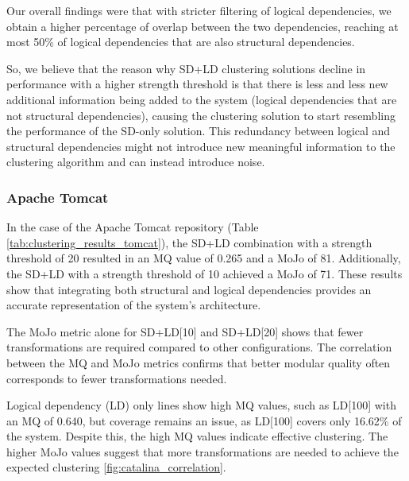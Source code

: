 \documentclass{ieeeaccess}
\begin{document}
Our overall findings were that with stricter filtering of logical dependencies, we obtain a higher percentage of overlap between the two dependencies, reaching at most 50\% of logical dependencies that are also structural dependencies.

So, we believe that the reason why SD+LD clustering solutions decline in performance with a higher strength threshold is that there is less and less new additional information being added to the system (logical dependencies that are not structural dependencies), causing the clustering solution to start resembling the performance of the SD-only solution. This redundancy between logical and structural dependencies might not introduce new meaningful information to the clustering algorithm and can instead introduce noise.


\subsubsection{Apache Tomcat}

In the case of the Apache Tomcat repository (Table \ref{tab:clustering_results_tomcat}), the SD+LD combination with a strength threshold of 20 resulted in an MQ value of 0.265 and a MoJo of 81. Additionally, the SD+LD with a strength threshold of 10 achieved a MoJo of 71. These results show that integrating both structural and logical dependencies provides an accurate representation of the system's architecture.

The MoJo metric alone for SD+LD[10] and SD+LD[20] shows that fewer transformations are required compared to other configurations. The correlation between the MQ and MoJo metrics confirms that better modular quality often corresponds to fewer transformations needed.

Logical dependency (LD) only lines show high MQ values, such as LD[100] with an MQ of 0.640, but coverage remains an issue, as LD[100] covers only 16.62\% of the system. Despite this, the high MQ values indicate effective clustering. The higher MoJo values suggest that more transformations are needed to achieve the expected clustering  \ref{fig:catalina_correlation}.
\end{document}
